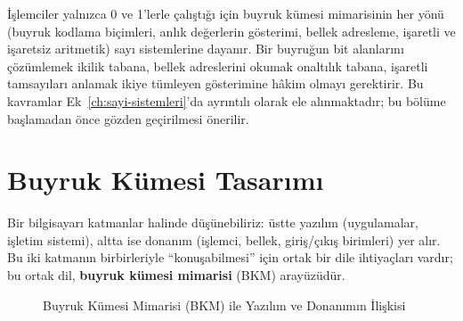 \begin{bilginot}
İşlemciler yalnızca 0 ve 1'lerle çalıştığı için buyruk kümesi mimarisinin her yönü (buyruk kodlama biçimleri, anlık değerlerin gösterimi, bellek adresleme, işaretli ve işaretsiz aritmetik) sayı sistemlerine dayanır. Bir buyruğun bit alanlarını çözümlemek ikilik tabana, bellek adreslerini okumak onaltılık tabana, işaretli tamsayıları anlamak ikiye tümleyen gösterimine hâkim olmayı gerektirir. Bu kavramlar Ek~\ref{ch:sayi-sistemleri}'da ayrıntılı olarak ele alınmaktadır; bu bölüme başlamadan önce gözden geçirilmesi önerilir.
\end{bilginot}


\section{Buyruk Kümesi Tasarımı}
\label{sec:bkm-tasarimi}

Bir bilgisayarı katmanlar halinde düşünebiliriz: üstte yazılım (uygulamalar, işletim sistemi), altta ise donanım (işlemci, bellek, giriş/çıkış birimleri) yer alır. Bu iki katmanın birbirleriyle ``konuşabilmesi'' için ortak bir dile ihtiyaçları vardır; bu ortak dil, \textbf{buyruk kümesi mimarisi} (BKM) arayüzüdür.

\begin{figure}[H]
\centering
{}
\caption{Buyruk Kümesi Mimarisi (BKM) ile Yazılım ve Donanımın İlişkisi}
\label{fig:bkm-iliskisi}
\end{figure}

